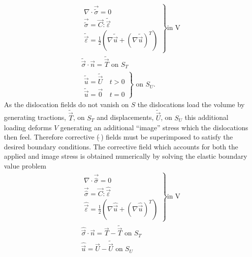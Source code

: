 \documentclass[11pt]{iopart}
\begin{document}
\begin{align}
     & \left.
    \begin{array}{l}
        \nabla\cdot{\vec{\tilde{\sigma}}} = 0                    \\
        \vec{\tilde{\sigma}} = \vec{C}:\tilde{\vec{\varepsilon}} \\
        \tilde{\vec{\varepsilon}}=\frac{1}{2}\left(\nabla\tilde{\vec{u}}+(\nabla\tilde{\vec{u}})^T\right)
    \end{array}
    \right\}\textrm{in V}                                                   \\
     & \tilde{\vec{\sigma}}\cdot\vec{n} = \tilde{\vec{T}} \textrm{ on } S_T \\
     & \left.
    \begin{array}{l}
        \tilde{\vec{u}} = \tilde{\vec{U}} \quad t>0 \\
        \tilde{\vec{u}} = \vec{0} \quad t=0
        \label{eq:utildebc}
    \end{array}
    \right\} \textrm{ on } S_U.
\end{align}
%
As the dislocation fields do not vanish on $S$ the dislocations load the volume by generating tractions, $\tilde{\vec{T}}$, on $S_T$ and displacements, $\tilde{\vec{U}}$, on $S_U$ this additional loading deforms $V$ generating an additional ``image'' stress which the dislocations then feel. Therefore corrective ($\hat{~}$) fields must be superimposed to satisfy the desired boundary conditions. The corrective field which accounts for both the applied and image stress is obtained numerically by solving the elastic boundary value problem
%
\begin{align}
     & \left.
    \begin{array}{l}
        \nabla\cdot{\vec{\hat{\sigma}}} = 0                  \\
        \vec{\hat{\sigma}} = \vec{C}:\hat{\vec{\varepsilon}} \\
        \hat{\vec{\varepsilon}}=\frac{1}{2}\left(\nabla\hat{\vec{u}}+(\nabla\hat{\vec{u}})^{T}\right)
    \end{array}
    \right\}\textrm{in V}                                                                            \\
     & \hat{\vec{\sigma}}\cdot\vec{n} = \vec{T} - \tilde{\vec{T}} \textrm{ on } S_T\label{eq:thatbc} \\
     & \hat{\vec{u}} = \vec{U} - \tilde{\vec{U}} \textrm{ on } S_U \label{eq:uhatbc}
\end{align}
\end{document}

